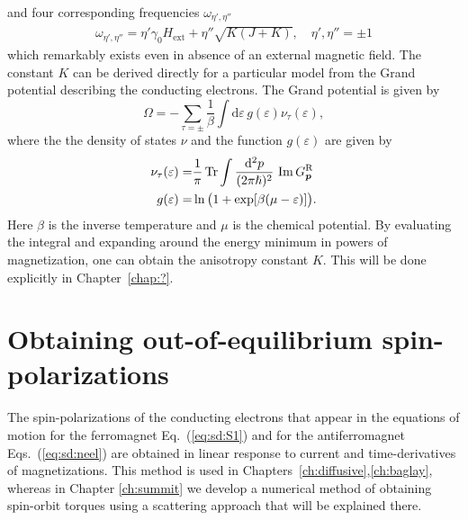 and four corresponding frequencies $\omega_{\eta',\eta''}$  
\begin{align}
    \omega_{\eta',\eta''} = \eta' \gamma_0 H_\text{ext} +\eta'' \sqrt{K(J+K)}, \quad \eta',\eta''=\pm1
\end{align}
which remarkably exists even in absence of an external magnetic field. The constant $K$ can be derived directly for a particular model from the Grand potential describing the conducting electrons. The Grand potential is given by
\begin{equation}
    \Omega = - \sum_{\tau=\pm}\frac{1}{\beta} \int \mathrm{d}\varepsilon\,g(\varepsilon) \nu_\tau(\varepsilon),
    \label{b1}
\end{equation}
where the the density of states $\nu$ and the function $g(\varepsilon)$ are given by
\begin{align}
    \nu_\tau(\varepsilon) = & \frac{1}{\pi} \operatorname{Tr} \int \frac{\mathrm{d}^2p}{(2\pi\hslash)^2}\,\operatorname{Im} G^\text{R}_{\boldsymbol{p}}\\
    g(\varepsilon) = & \mathop{\mathrm{ln}}\nolimits \big(1+\exp[\beta(\mu-\varepsilon)]\big).
    \label{eq:nu}
\end{align}
Here $\beta$ is the inverse temperature and $\mu$ is the chemical potential. By evaluating the integral and expanding around the energy minimum in powers of magnetization, one can obtain the anisotropy constant $K$. This will be done explicitly in Chapter~\ref{chap:?}.

\section{Obtaining out-of-equilibrium spin-polarizations}\label{diagrammatics}
The spin-polarizations of the conducting electrons that appear in the equations of motion for the ferromagnet Eq.~(\ref{eq:sd:S1}) and for the antiferromagnet Eqs.~(\ref{eq:sd:neel}) are obtained in linear response to current and time-derivatives of magnetizations. This method is used in Chapters~\ref{ch:diffusive},\ref{ch:baglay}, whereas in Chapter \ref{ch:summit} we develop a numerical method of obtaining spin-orbit torques using a scattering approach that will be explained there. 

